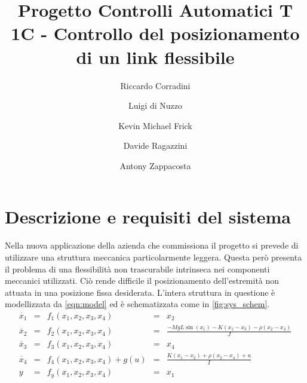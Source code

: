 \documentclass[a4paper]{article}
\title{Progetto Controlli Automatici T \\ 1C - Controllo del posizionamento di un link flessibile}
\author{Riccardo Corradini \and Luigi di Nuzzo \and Kevin Michael Frick \and Davide Ragazzini \and Antony Zappacosta}
\begin{document}
\maketitle
\section{Descrizione e requisiti del sistema}
Nella nuova applicazione della azienda che commissiona il progetto si prevede di utilizzare una struttura meccanica particolarmente leggera. 
Questa però presenta il problema di una flessibilità non trascurabile intrinseca nei componenti meccanici utilizzati. 
Ciò rende difficile il posizionamento dell’estremità non attuata in una posizione fissa desiderata.
L’intera struttura in questione è modellizzata da \cref{eqn:model} ed è schematizzata come in \cref{fig:sys_schem}.
\begin{equation}
    \label{eqn:model}
    \begin{array}{lclcc}    
    \dot{x_1} & = & f_1 (x_1, x_2, x_3, x_4) & = & x_2 \\
    \dot{x_2} & = & f_2 (x_1, x_2, x_3, x_4) & = & \frac{-M g L \sin (x_1) - K (x_1 - x_3) - \rho (x_2 - x_4)}{J} \\
    \dot{x_3} & = & f_3 (x_1, x_2, x_3, x_4) & = & x_4 \\
    \dot{x_4} & = & f_4 (x_1, x_2, x_3, x_4) + g(u) & = & \frac{K(x_1 - x_2) + \rho (x_2 - x_4) + u}{I}\\
    y & = & f_y (x_1, x_2, x_3, x_4) & = & x_1
    \end{array}
\end{equation}
\end{document}
